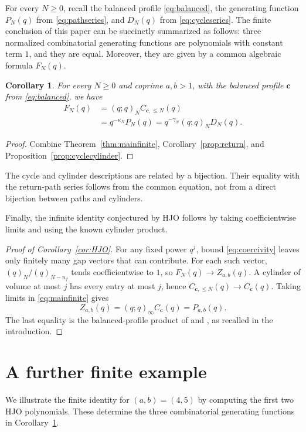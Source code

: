 \documentclass[12pt,reqno]{amsart}
\numberwithin{equation}{section}
\newtheorem{corollary}[theorem]{Corollary}
\theoremstyle{definition}
\theoremstyle{remark}
\theoremstyle{plain}
\newcommand{\cc}{\mathbf c}
\begin{document}
For every $N\ge 0$, recall the balanced profile \eqref{eq:balanced}, the generating function $P_N(q)$ from \eqref{eq:pathseries}, and $D_N(q)$ from \eqref{eq:cycleseries}. The finite conclusion of this paper can be succinctly summarized as follows: three normalized combinatorial generating functions are polynomials with constant term $1$, and they are equal. Moreover, they are given by a common algebraic formula $F_N(q)$.

\begin{corollary}\label{cor:threemodels}
For every $N\ge 0$ and coprime $a,b>1$, with the balanced profile $\cc$ from \eqref{eq:balanced}, we have
\begin{equation}\label{eq:threeway}
 \begin{aligned}
 F_N(q)&=(q;q)_N C_{\cc,\le N}(q)\\
       &=q^{-\kappa_N}P_N(q)
        =q^{-\gamma_N}(q;q)_N D_N(q).
 \end{aligned}
\end{equation}
\end{corollary}
\begin{proof}
Combine Theorem~\ref{thm:mainfinite}, Corollary~\ref{prop:return},
and Proposition~\ref{prop:cyclecylinder}.
\end{proof}

The cycle and cylinder descriptions are related by a bijection.
Their equality with the return-path series follows from the common
equation, not from a direct bijection between paths and cylinders.

Finally, the infinite identity conjectured by HJO follows by taking coefficientwise limits and
using the known cylinder product.

\begin{proof}[Proof of Corollary~\ref{cor:HJO}]
For any fixed power $q^j$, bound \eqref{eq:coercivity} leaves only
finitely many gap vectors that can contribute.  For each such vector,
$(q)_N/(q)_{N-n_f}$ tends coefficientwise to $1$, so
$F_N(q)\to Z_{a,b}(q)$.  A cylinder of volume at most $j$ has every
entry at most $j$, hence $C_{\cc,\le N}(q)\to C_\cc(q)$.
Taking limits in \eqref{eq:mainfinite} gives
\[
 Z_{a,b}(q)=(q;q)_\infty C_\cc(q)=P_{a,b}(q).
\]
The last equality is the balanced-profile product of
\cite[Proposition~9.3]{HJO} and \cite[Sections~2--3]{FW}, as recalled
in the introduction.
\end{proof}

\section{\texorpdfstring{A further finite example}{A further finite example}}\label{sec:examples}
We illustrate the finite identity for $(a,b)=(4,5)$ by computing the
first two HJO polynomials.  These determine the three combinatorial generating functions in Corollary~\ref{cor:threemodels}.
\end{document}

